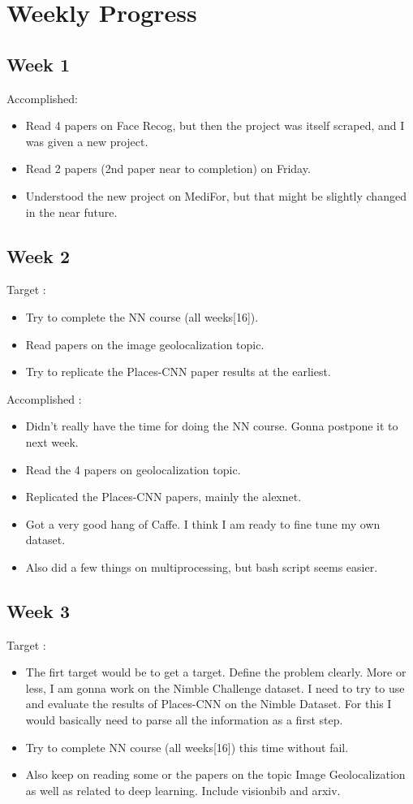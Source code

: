 \documentclass{article}
\begin{document}
\section{Weekly Progress}
\subsection{Week 1}
Accomplished:
\begin{itemize}
\item Read 4 papers on Face Recog, but then the project was itself scraped, and I was given a new project.
\item Read 2 papers (2nd paper near to completion) on Friday.
\item Understood the new project on MediFor, but that might be slightly changed in the near future.
\end{itemize}


\subsection{Week 2}
Target :
\begin{itemize}
\item Try to complete the NN course (all weeks[16]).
\item Read papers on the image geolocalization topic.
\item Try to replicate the Places-CNN paper results at the earliest.
\end{itemize}

Accomplished :
\begin{itemize}
\item Didn't really have the time for doing the NN course. Gonna postpone it to next week.
\item Read the 4 papers on geolocalization topic.
\item Replicated the Places-CNN papers, mainly the alexnet.
\item Got a very good hang of Caffe. I think I am ready to fine tune my own dataset.
\item Also did a few things on multiprocessing, but bash script seems easier.
\end{itemize}

\subsection{Week 3}
Target :
\begin{itemize}
\item The firt target would be to get a target. Define the problem clearly. More or less, I am gonna work on the Nimble Challenge dataset. I need to try to use and evaluate the results of Places-CNN on the Nimble Dataset. For this I would basically need to parse all the information as a first step.
\item Try to complete NN course (all weeks[16]) this time without fail.
\item Also keep on reading some or the papers on the topic Image Geolocalization as well as related to deep learning. Include visionbib and arxiv.
\end{itemize}
\end{document}
